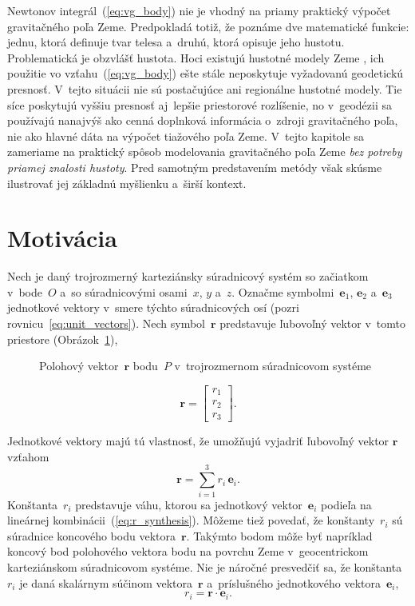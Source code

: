 \documentclass[a4paper,12pt]{book}
\let\vec\mathbf
\begin{document}
Newtonov integrál~(\ref{eq:vg_body}) nie je vhodný na priamy praktický výpočet 
gravitačného poľa Zeme.  Predpokladá totiž, že poznáme dve matematické funkcie: 
jednu, ktorá definuje tvar telesa a~druhú, ktorá opisuje jeho hustotu.  
Problematická je obzvlášť hustota.  Hoci existujú hustotné modely Zeme 
\parencite[napríklad][]{Dziewonski1981}, ich použitie vo 
vzťahu~(\ref{eq:vg_body}) ešte stále neposkytuje vyžadovanú geodetickú 
presnosť.  V~tejto situácii nie sú postačujúce ani regionálne hustotné modely.  
Tie síce poskytujú vyššiu presnosť aj~lepšie priestorové rozlíšenie, no 
v~geodézii sa používajú nanajvýš ako cenná doplnková informácia o~zdroji 
gravitačného poľa, nie ako hlavné dáta na výpočet tiažového poľa Zeme.  V~tejto 
kapitole sa zameriame na praktický spôsob modelovania gravitačného poľa Zeme 
\emph{bez potreby priamej znalosti hustoty}.  Pred samotným predstavením metódy 
však skúsme ilustrovať jej základnú myšlienku a~širší kontext.






\section{Motivácia}
\label{sec:sh_motivation}

Nech je daný trojrozmerný karteziánsky súradnicový systém so začiatkom 
v~bode~$O$ a~so súradnicovými osami~$x$, $y$ a~$z$.  Označme symbolmi~$\vec 
e_1$, $\vec e_2$ a~$\vec e_3$ jednotkové vektory v~smere týchto súradnicových 
osí (pozri rovnicu~\ref{eq:unit_vectors}).  Nech symbol~$\vec r$ predstavuje 
ľubovoľný vektor v~tomto priestore (Obrázok~\ref{fig:unit_vectors}),
%
\begin{figure}
\centering

\caption{Polohový vektor~$\vec r$ bodu~$P$ v~trojrozmernom súradnicovom 
systéme}
\label{fig:unit_vectors}
\end{figure}

\begin{equation}
\vec r =
\begin{bmatrix}
r_1\\
r_2\\
r_3
\end{bmatrix}
{.}
\end{equation}

Jednotkové vektory majú tú vlastnosť, že umožňujú vyjadriť ľubovoľný vektor
$\vec r$ vzťahom
%
\begin{equation}
\label{eq:r_synthesis}
\vec r = \sum_{i = 1}^3 r_i \, \vec e_i{.}
\end{equation}
%
Konštanta~$r_i$ predstavuje váhu, ktorou sa jednotkový vektor~$\vec e_i$ 
podieľa na lineárnej kombinácii~(\ref{eq:r_synthesis}).  Môžeme tiež povedať, 
že konštanty~$r_i$ sú súradnice koncového bodu vektora~$\vec r$.  Takýmto bodom 
môže byť napríklad koncový bod polohového vektora bodu na povrchu Zeme 
v~geocentrickom karteziánskom súradnicovom systéme.  Nie je náročné presvedčiť 
sa, že konštanta~$r_i$ je daná skalárnym súčinom vektora~$\vec r$ a~príslušného 
jednotkového vektora~$\vec e_i$,
%
\begin{equation}
\label{eq:r_analysis}
r_i = \vec r \cdot \vec e_i{.}
\end{equation}
\end{document}
